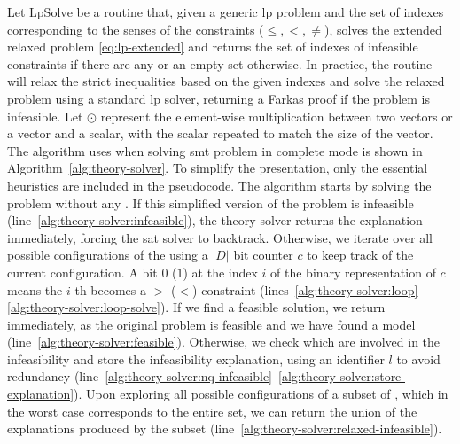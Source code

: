 \documentclass[runningheads]{llncs}
\begin{document}
Let $\text{LpSolve}$ be a routine that, given a generic \gls{lp} problem and the set of indexes corresponding to the senses of the constraints ($\le, <, \ne$), solves the extended relaxed problem \eqref{eq:lp-extended} and returns the set of indexes of infeasible constraints if there are any or an empty set otherwise.
In practice, the routine will relax the strict inequalities based on the given indexes and solve the relaxed problem using a standard \gls{lp} solver, returning a Farkas proof if the problem is infeasible.
Let  $\odot$ represent the element-wise multiplication between two vectors or a vector and a scalar, with the scalar repeated to match the size of the vector.
The algorithm \dlinear uses when solving \gls{smt} problem in complete mode is shown in Algorithm~\ref{alg:theory-solver}.
To simplify the presentation, only the essential heuristics are included in the pseudocode.
The algorithm starts by solving the problem without any \nqcs.
If this simplified version of the problem is infeasible (line~\ref{alg:theory-solver:infeasible}), the theory solver returns the explanation immediately, forcing the \gls{sat} solver to backtrack.
Otherwise, we iterate over all possible configurations of the \nqcs using a $|{D}|$ bit counter $c$ to keep track of the current configuration.
A bit $0$ ($1$) at the index $i$ of the binary representation of $c$ means the $i$-th \nqc becomes a $>$ ($<$) constraint (lines~\ref{alg:theory-solver:loop}--\ref{alg:theory-solver:loop-solve}).
If we find a feasible solution, we return immediately, as the original problem is feasible and we have found a model (line~\ref{alg:theory-solver:feasible}).
Otherwise, we check which \nqcs are involved in the infeasibility and store the infeasibility explanation, using an identifier $l$ to avoid redundancy (line~\ref{alg:theory-solver:nq-infeasible}--\ref{alg:theory-solver:store-explanation}).
Upon exploring all possible configurations of a subset of \nqcs, which in the worst case corresponds to the entire set, we can return the union of the explanations produced by the subset (line~\ref{alg:theory-solver:relaxed-infeasible}).
\end{document}
